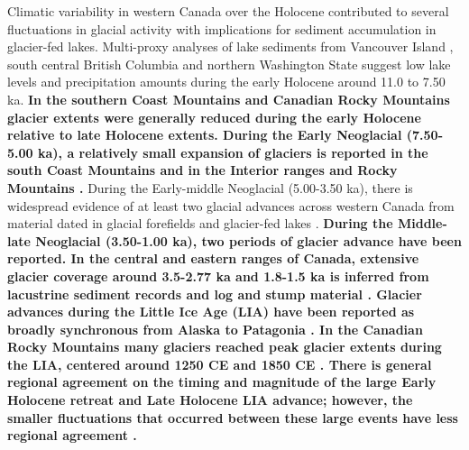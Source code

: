 \documentclass[Royal,times,doublespace,sageh]{sagej}
\begin{document}
Climatic variability in western Canada over the Holocene contributed to
several fluctuations in glacial activity with implications for sediment
accumulation in glacier-fed lakes. Multi-proxy analyses of lake
sediments from Vancouver Island \citep{Brown2006}, south central British
Columbia \citep{Lowe1997} and northern Washington State
\citep{Steinman2019} suggest low lake levels and precipitation amounts
during the early Holocene around 11.0 to 7.50 ka. \textbf{In the
southern Coast Mountains \citep{Menounos2004, Koch2007a, Osborn2007} and
Canadian Rocky Mountains \citep{Luckman1988, Luckman1993, Luckman1993a}
glacier extents were generally reduced during the early Holocene
relative to late Holocene extents. During the Early Neoglacial
(7.50-5.00 ka), a relatively small expansion of glaciers is reported in
the south Coast Mountains
\citep{Osborn2007, Filippelli2006, Ryder1986, Harvey2012} and in the
Interior ranges and Rocky Mountains \citep{Luckman1993}.} During the
Early-middle Neoglacial (5.00-3.50 ka), there is widespread evidence of
at least two glacial advances across western Canada from material dated
in glacial forefields and glacier-fed lakes
\citep{Koch2007a, Osborn2007, Menounos2008c, Gardner1985, Wood2004, Hodder2006b, Desloges1999, Leonard1999}.
\textbf{During the Middle-late Neoglacial (3.50-1.00 ka), two periods of
glacier advance have been reported. In the central and eastern ranges of
Canada, extensive glacier coverage around 3.5-2.77 ka and 1.8-1.5 ka is
inferred from lacustrine sediment records
\citep{Leonard1999, Leonard1997, Dirszowsky1997a, Desloges1999} and log
and stump material \citep{Wood2004, Luckman1995, Luckman1999}. Glacier
advances during the Little Ice Age (LIA) have been reported as broadly
synchronous from Alaska to Patagonia \citep{Luckman2000g}. In the
Canadian Rocky Mountains many glaciers reached peak glacier extents
during the LIA, centered around 1250 CE
\citep{Luckman1995, Osborn2001, Leonard1997} and 1850 CE
\citep{Luckman2000g, Leonard1997}. There is general regional agreement
on the timing and magnitude of the large Early Holocene retreat and Late
Holocene LIA advance; however, the smaller fluctuations that occurred
between these large events have less regional agreement
\citep{Menounos2009b}.}
\end{document}
